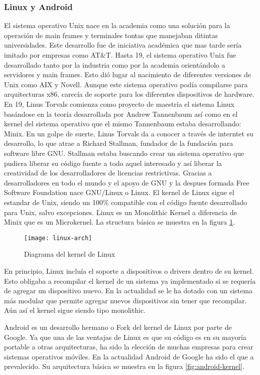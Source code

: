 \subsubsection{Linux y Android}

El sistema operativo Unix nace en la academia como una solución para la
operación de main frames y terminales tontas que manejaban ditintas
universidades. Este desarrollo fue de iniciativa académica que mas tarde sería
imitado por empresas como AT\&T. Hasta 19, el sistema operativo Unix fue
desarrollado tanto por la industria como por la academia orientándolo a
servidores y main frames. Esto dió lugar al nacimiento de diferentes versiones
de Unix como AIX y Novell. Aunque este sistema operativo podía compilarse para
arquitecturas x86, carecía de soporte para los diferentes dispositivos de
hardware. En 19, Linus Torvals comienza como proyecto de maestría el sistema
Linux basándose en la teoría desarrollada por Andrew Tannenbaum así como en el
kernel del sistema operativo que el mismo Tannenbaum estaba desarrollando:
Minix. En un golpe de suerte, Linus Torvals da a conocer a través de interntet
su desarrollo, lo que atrae a Richard Stallman, fundador de la fundación para
software libre GNU. Stallman estaba buscando crear un sistema operativo que
pudiera liberar su código fuente a todo aquel interesado y así liberar la
creatividad de los desarrolladores de licencias restrictivas. Gracias a
desarrolladores en todo el mundo y el apoyo de GNU y la despues formada Free
Software Foundation nace GNU/Linux o Linux. El kernel de Linux sigue el
estandar de Unix, siendo un 100\% compatible con el código fuente desarrollado
para Unix, salvo excepciones. Linux es un Monolithic Kernel a diferencia de
Minix que es un Microkernel. La structura básica se muestra en la figura
\ref{fig:linux-kernel}.

\begin{figure}[H]
  \centering
  \texttt{[image: linux-arch]}
  \caption{Diagrama del kernel de Linux}
  \label{fig:linux-kernel}
\end{figure}


En principio, Linux incluía el soporte a dispositivos o drivers dentro de su
kernel. Esto obligaba a recompilar el kernel de un sistema ya implementado si
se requería de agregar un dispositivo nuevo. En la actualidad se le ha dotado
con un sistema más modular que permite agregar nuevos dispositivos sin tener
que recompilar. Aún así el kernel sigue siendo tipo monolithic.

Android es un desarrollo hermano o Fork del kernel de Linux por parte de
Google. Ya que una de las ventajas de Linux es que su código es en su mayoría
portable a otras arquitecturas, ha sido la elección de muchas empresas para
crear sistemas operativos móviles. En la actualidad Android de Google ha sido
el que a prevalecido. Su arquitectura básica se muestra en la figura
\ref{fig:android-kernel}.

